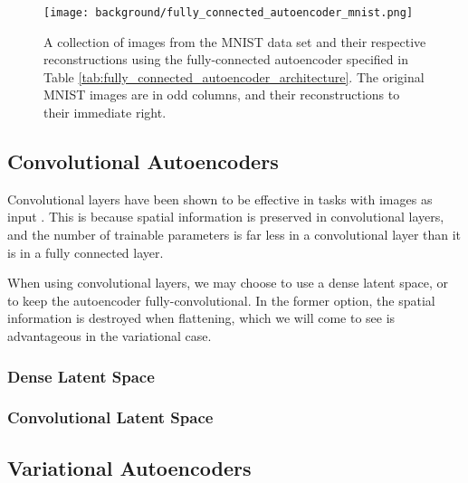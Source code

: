 \begin{figure}[h!]
\centering
\captionsetup{justification=centering}
\texttt{[image: background/fully\_connected\_autoencoder\_mnist.png]}
\caption{A collection of images from the MNIST data set and their respective reconstructions using the fully-connected autoencoder specified in Table \ref{tab:fully_connected_autoencoder_architecture}. The original MNIST images are in odd columns, and their reconstructions to their immediate right.}
\label{fig:fully_connected_autoencoder_mnist}
\end{figure}

\subsection{Convolutional Autoencoders}

Convolutional layers have been shown to be effective in tasks with images as input \cite{Krizhevsky2012, Zeiler2014, Szegedy2015}. This is because spatial information is preserved in convolutional layers, and the number of trainable parameters is far less in a convolutional layer than it is in a fully connected layer.

When using convolutional layers, we may choose to use a dense latent space, or to keep the autoencoder fully-convolutional. In the former option, the spatial information is destroyed when flattening, which we will come to see is advantageous in the variational case.

\subsubsection{Dense Latent Space}

\subsubsection{Convolutional Latent Space}

\subsection{Variational Autoencoders}